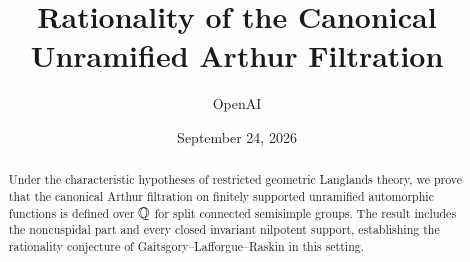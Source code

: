 \documentclass[11pt]{article}
\title{Rationality of the Canonical Unramified Arthur Filtration}
\author{OpenAI}
\date{September 24, 2026}
\begin{document}
\maketitle
\begin{abstract}
Under the characteristic hypotheses of restricted geometric Langlands theory,
we prove that the canonical Arthur filtration on finitely supported
unramified automorphic functions is defined over $\mathbb Q$ for split connected
semisimple groups. The result includes the noncuspidal part and every closed
invariant nilpotent support, establishing the rationality conjecture of
Gaitsgory--Lafforgue--Raskin in this setting.
\end{abstract}
\begingroup
\footnotesize
\tableofcontents
\endgroup








\end{document}
